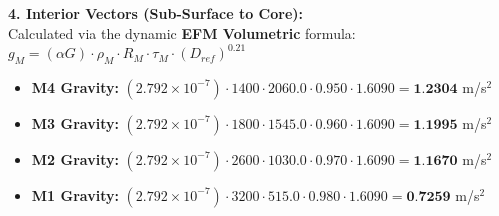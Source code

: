 \documentclass[11pt, a4paper]{article}
\begin{document}
  \vspace{0.5em}
  \noindent \textbf{4. Interior Vectors (Sub-Surface to Core):} \\[0.5em]
  \hspace*{1em} Calculated via the dynamic \textbf{EFM Volumetric} formula: $g_M = (\alpha G) \cdot \rho_{M} \cdot R_M \cdot \tau_M \cdot (D_{ref})^{0.21}$
  \begin{itemize}
    \item \textbf{M4 Gravity:} $(2.792 \times 10^{-7}) \cdot 1400 \cdot 2060.0 \cdot 0.950 \cdot 1.6090 = \textbf{1.2304}$ m/s$^2$
    \item \textbf{M3 Gravity:} $(2.792 \times 10^{-7}) \cdot 1800 \cdot 1545.0 \cdot 0.960 \cdot 1.6090 = \textbf{1.1995}$ m/s$^2$
    \item \textbf{M2 Gravity:} $(2.792 \times 10^{-7}) \cdot 2600 \cdot 1030.0 \cdot 0.970 \cdot 1.6090 = \textbf{1.1670}$ m/s$^2$
    \item \textbf{M1 Gravity:} $(2.792 \times 10^{-7}) \cdot 3200 \cdot 515.0 \cdot 0.980 \cdot 1.6090 = \textbf{0.7259}$ m/s$^2$
  \end{itemize}
\end{document}
